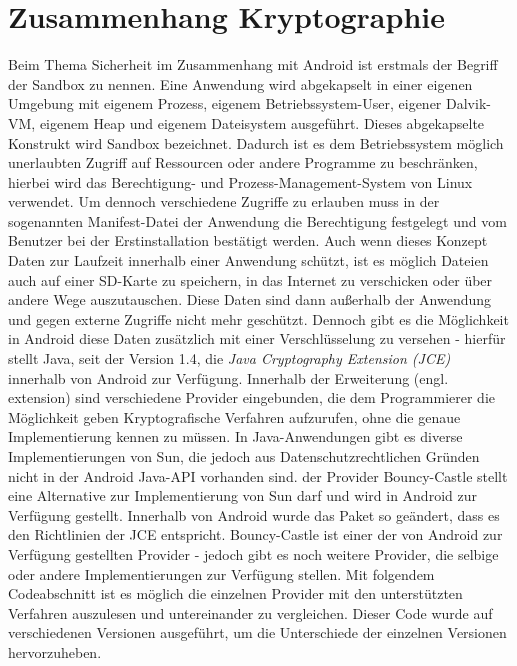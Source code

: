 \documentclass[10pt, a4paper,headsepline]{scrreprt}
\begin{document}
\section{Zusammenhang Kryptographie}
Beim Thema Sicherheit im Zusammenhang mit Android ist erstmals der Begriff der Sandbox zu nennen. Eine Anwendung wird abgekapselt in einer eigenen Umgebung mit eigenem Prozess, eigenem Betriebssystem-User, eigener Dalvik-VM, eigenem Heap und eigenem Dateisystem ausgeführt. Dieses abgekapselte Konstrukt wird Sandbox bezeichnet. Dadurch ist es dem Betriebssystem möglich unerlaubten Zugriff auf Ressourcen oder andere Programme zu beschränken, hierbei wird das Berechtigung- und Prozess-Management-System von Linux verwendet. %
Um dennoch verschiedene Zugriffe zu erlauben muss in der sogenannten Manifest-Datei der Anwendung die Berechtigung festgelegt und vom Benutzer bei der Erstinstallation bestätigt werden.
Auch wenn dieses Konzept Daten zur Laufzeit innerhalb einer Anwendung schützt, ist es möglich Dateien auch auf einer SD-Karte zu speichern, in das Internet zu verschicken oder über andere Wege auszutauschen. Diese Daten sind dann außerhalb der Anwendung und gegen externe Zugriffe nicht mehr geschützt.
Dennoch gibt es die Möglichkeit in Android diese Daten zusätzlich mit einer Verschlüsselung zu versehen - hierfür stellt Java, seit der Version 1.4, die \textit{Java Cryptography Extension (JCE)} innerhalb von Android zur Verfügung. Innerhalb der Erweiterung (engl. extension) sind verschiedene Provider eingebunden, die dem Programmierer die Möglichkeit geben Kryptografische Verfahren aufzurufen, ohne die genaue Implementierung kennen zu müssen. In Java-Anwendungen gibt es diverse Implementierungen von Sun, die jedoch aus Datenschutzrechtlichen Gründen nicht in der Android Java-API vorhanden sind. der Provider Bouncy-Castle stellt eine Alternative zur Implementierung von Sun darf und wird in Android zur Verfügung gestellt. Innerhalb von Android wurde das Paket so geändert, dass es den Richtlinien der JCE entspricht. 
Bouncy-Castle ist einer der von Android zur Verfügung gestellten Provider - jedoch gibt es noch weitere Provider, die selbige oder andere Implementierungen zur Verfügung stellen. Mit folgendem Codeabschnitt ist es möglich die einzelnen Provider mit den unterstützten Verfahren auszulesen und untereinander zu vergleichen. Dieser Code wurde auf verschiedenen Versionen ausgeführt, um die Unterschiede der einzelnen Versionen hervorzuheben. \\
\end{document}
